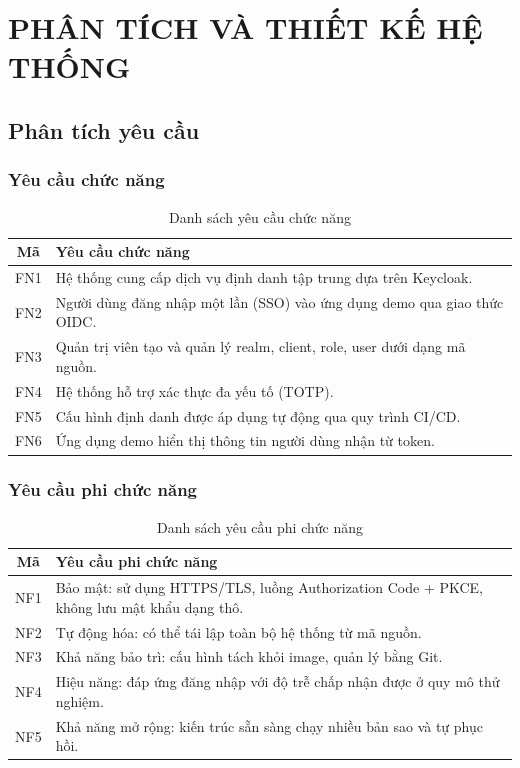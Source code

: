 \chapter{PHÂN TÍCH VÀ THIẾT KẾ HỆ THỐNG}
\label{ch:thietke}

\section{Phân tích yêu cầu}
\label{sec:yeucau}

\subsection{Yêu cầu chức năng}

\begin{table}[htbp]
\centering
\caption{Danh sách yêu cầu chức năng}
\label{tab:req-cn}
\small
\begin{tabular}{c p{9.5cm}}
\toprule
\textbf{Mã} & \textbf{Yêu cầu chức năng}\\
\midrule
FN1 & Hệ thống cung cấp dịch vụ định danh tập trung dựa trên Keycloak.\\
FN2 & Người dùng đăng nhập một lần (SSO) vào ứng dụng demo qua giao thức OIDC.\\
FN3 & Quản trị viên tạo và quản lý realm, client, role, user dưới dạng mã nguồn.\\
FN4 & Hệ thống hỗ trợ xác thực đa yếu tố (TOTP).\\
FN5 & Cấu hình định danh được áp dụng tự động qua quy trình CI/CD.\\
FN6 & Ứng dụng demo hiển thị thông tin người dùng nhận từ token.\\
\bottomrule
\end{tabular}
\end{table}

\subsection{Yêu cầu phi chức năng}

\begin{table}[htbp]
\centering
\caption{Danh sách yêu cầu phi chức năng}
\label{tab:req-pcn}
\small
\begin{tabular}{c p{9.5cm}}
\toprule
\textbf{Mã} & \textbf{Yêu cầu phi chức năng}\\
\midrule
NF1 & Bảo mật: sử dụng HTTPS/TLS, luồng Authorization Code + PKCE, không lưu mật khẩu dạng thô.\\
NF2 & Tự động hóa: có thể tái lập toàn bộ hệ thống từ mã nguồn.\\
NF3 & Khả năng bảo trì: cấu hình tách khỏi image, quản lý bằng Git.\\
NF4 & Hiệu năng: đáp ứng đăng nhập với độ trễ chấp nhận được ở quy mô thử nghiệm.\\
NF5 & Khả năng mở rộng: kiến trúc sẵn sàng chạy nhiều bản sao và tự phục hồi.\\
\bottomrule
\end{tabular}
\end{table}

